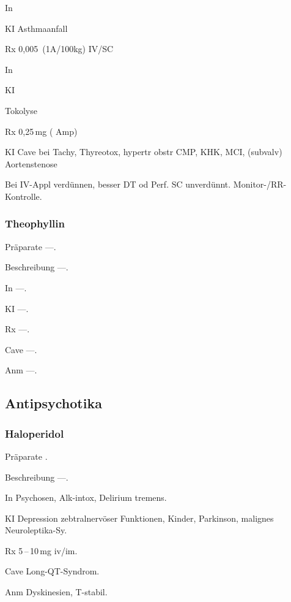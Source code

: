 \begin{labeling}[:]{mm}\item[In] \item[KI] Asthmaanfall

\item[Rx] 0,005\, (1A/100kg) IV/SC

\begin{labeling}[:]{mm}\item[In] \item[KI]\end{labeling} Tokolyse 

\item[Rx] 0,25\,mg ({\textonehalf} Amp)

\item[KI]  Cave bei Tachy, Thyreotox, hypertr obstr CMP, KHK, MCI, (subvalv)
Aortenstenose

Bei IV-Appl verdünnen, besser DT od Perf. SC unverdünnt.
Monitor-/RR-Kontrolle.
\end{labeling}

\subsubsection{Theophyllin}

\begin{labeling}[:]{mm}
  \item[Präparate] ---.
  \item[Beschreibung] ---.
  \item[In] ---.
  \item[KI] ---.
  \item[Rx] ---.
  \item[Cave] ---.
  \item[Anm] ---.
\end{labeling}



\subsection{Antipsychotika}

\subsubsection{Haloperidol}

\begin{labeling}[:]{mm}
  \item[Präparate]  .
  \item[Beschreibung] ---.
  \item[In] Psychosen, Alk-intox, Delirium tremens.
  \item[KI] Depression zebtralnervöser Funktionen, Kinder, Parkinson,
malignes Neuroleptika-Sy.
  \item[Rx]  5\,--\,10\,mg iv/im.
  \item[Cave] Long-QT-Syndrom.
  \item[Anm] Dyskinesien, T{\textdegree}-stabil.
\end{labeling}




